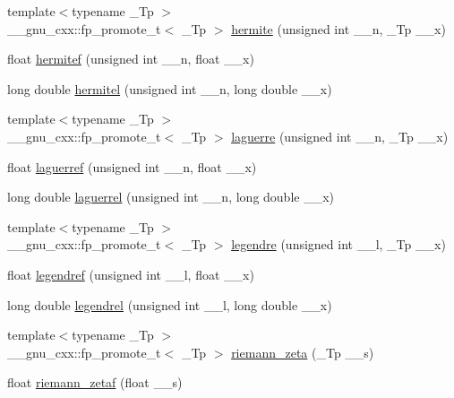\begin{DoxyCompactItemize}
\item 
{\footnotesize template$<$typename \+\_\+\+Tp $>$ }\\\+\_\+\+\_\+gnu\+\_\+cxx\+::fp\+\_\+promote\+\_\+t$<$ \+\_\+\+Tp $>$ \hyperlink{group__mathsf__std_ga8bd1626f1e3f7256c4fd13579f881183}{hermite} (unsigned int \+\_\+\+\_\+n, \+\_\+\+Tp \+\_\+\+\_\+x)
\item 
float \hyperlink{group__mathsf__std_ga94dae7444bb349e33057a92932db8abe}{hermitef} (unsigned int \+\_\+\+\_\+n, float \+\_\+\+\_\+x)
\item 
long double \hyperlink{group__mathsf__std_ga21f8e312ee3e65286f86bf141b0f32e0}{hermitel} (unsigned int \+\_\+\+\_\+n, long double \+\_\+\+\_\+x)
\item 
{\footnotesize template$<$typename \+\_\+\+Tp $>$ }\\\+\_\+\+\_\+gnu\+\_\+cxx\+::fp\+\_\+promote\+\_\+t$<$ \+\_\+\+Tp $>$ \hyperlink{group__mathsf__std_ga9d7b24a11dad27690387405548973ef9}{laguerre} (unsigned int \+\_\+\+\_\+n, \+\_\+\+Tp \+\_\+\+\_\+x)
\item 
float \hyperlink{group__mathsf__std_gada763419b0e21b38e38daa8b6eb56a8c}{laguerref} (unsigned int \+\_\+\+\_\+n, float \+\_\+\+\_\+x)
\item 
long double \hyperlink{group__mathsf__std_gaaf8b141edf9163b37ea4f2ed3e0191fc}{laguerrel} (unsigned int \+\_\+\+\_\+n, long double \+\_\+\+\_\+x)
\item 
{\footnotesize template$<$typename \+\_\+\+Tp $>$ }\\\+\_\+\+\_\+gnu\+\_\+cxx\+::fp\+\_\+promote\+\_\+t$<$ \+\_\+\+Tp $>$ \hyperlink{group__mathsf__std_gad06811f4e139b0ba84235c1f0d34d86e}{legendre} (unsigned int \+\_\+\+\_\+l, \+\_\+\+Tp \+\_\+\+\_\+x)
\item 
float \hyperlink{group__mathsf__std_gaed94e3c664c99f5204da75be75aeac21}{legendref} (unsigned int \+\_\+\+\_\+l, float \+\_\+\+\_\+x)
\item 
long double \hyperlink{group__mathsf__std_ga1b39bc22e3cc4860d08eb54099460391}{legendrel} (unsigned int \+\_\+\+\_\+l, long double \+\_\+\+\_\+x)
\item 
{\footnotesize template$<$typename \+\_\+\+Tp $>$ }\\\+\_\+\+\_\+gnu\+\_\+cxx\+::fp\+\_\+promote\+\_\+t$<$ \+\_\+\+Tp $>$ \hyperlink{group__mathsf__std_gac4ef9d52ee583c77937c3a420b7c72ca}{riemann\+\_\+zeta} (\+\_\+\+Tp \+\_\+\+\_\+s)
\item 
float \hyperlink{group__mathsf__std_gaf92063315061a56d3e2c4053156d968e}{riemann\+\_\+zetaf} (float \+\_\+\+\_\+s)

\end{DoxyCompactItemize}
